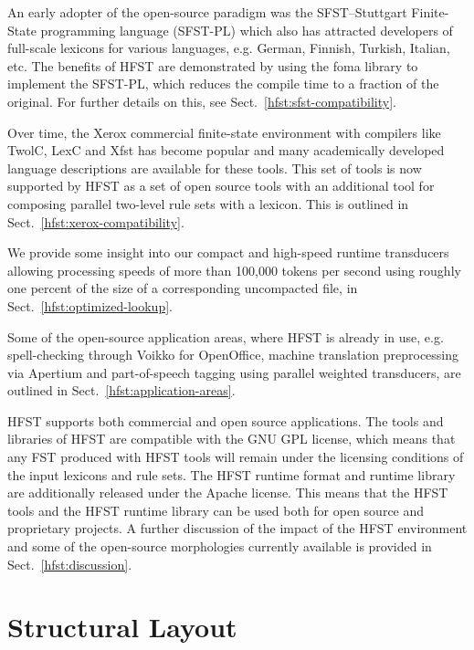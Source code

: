 \documentclass{llncs}
\begin{document}
\sloppy An early adopter of the open-source paradigm was the SFST--Stuttgart Finite-State 
programming language (SFST-PL) which also has attracted developers of full-scale lexicons for 
various languages, e.g. German, Finnish, Turkish, Italian, etc. The benefits of HFST are 
demonstrated by using the foma library to implement the SFST-PL,
which reduces the compile time to a fraction of the original. For further details on this, 
see Sect.~\ref{hfst:sfst-compatibility}.

Over time, the Xerox commercial finite-state environment with compilers like TwolC, 
LexC and Xfst has become popular and many academically developed language 
descriptions are available for these tools. This set of tools is now supported by
HFST as a set of open source tools with an additional tool for composing parallel 
two-level rule sets with a lexicon. This is outlined in Sect.~\ref{hfst:xerox-compatibility}.

We provide some insight into our compact and high-speed runtime transducers allowing 
processing speeds of more than 100,000 tokens per second using roughly one percent of 
the size of a corresponding uncompacted file, in Sect.~\ref{hfst:optimized-lookup}. 

Some of the open-source application areas, where HFST is already in use, e.g. 
spell-checking through Voikko for OpenOffice, machine translation preprocessing via Apertium 
and part-of-speech tagging using parallel weighted transducers, are outlined in Sect.~\ref{hfst:application-areas}.

HFST supports both commercial and open source applications. The tools and libraries of HFST are
compatible with the GNU GPL license, which means that any FST produced with HFST tools will 
remain under the licensing conditions of the input lexicons and rule sets. The HFST runtime
format and runtime library are additionally released under the Apache license. This means that the
HFST tools and the HFST runtime library can be used both for open source and proprietary projects.
A further discussion of the impact of the HFST environment and some of the open-source 
morphologies currently available is provided in Sect.~\ref{hfst:discussion}.


\section{Structural Layout}\label{hfst:structural-layout}
\end{document}
